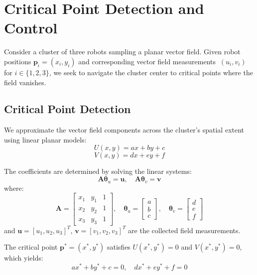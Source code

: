 \documentclass[lettersize,journal]{IEEEtran}
\begin{document}
\section{Critical Point Detection and Control}
\noindent 
Consider a cluster of three robots sampling a planar vector field. Given robot positions $\mathbf{p}_i = (x_i, y_i)$ and corresponding vector field measurements $\ (u_i, v_i)$ for $i \in \{1, 2, 3\}$, we seek to navigate the cluster center to critical points where the field vanishes.

\subsection{Critical Point Detection}
We approximate the vector field components across the cluster's spatial extent using linear planar models:
\begin{equation}
U(x,y) = ax + by + c
\end{equation}
\begin{equation}
V(x,y) = dx + ey + f
\end{equation}

The coefficients are determined by solving the linear systems:
\begin{equation}
\mathbf{A}\boldsymbol{\theta}_u = \mathbf{u}, \quad \mathbf{A}\boldsymbol{\theta}_v = \mathbf{v}
\end{equation}
where:
\begin{equation}
\mathbf{A} = \begin{bmatrix} x_1 & y_1 & 1 \\ x_2 & y_2 & 1 \\ x_3 & y_3 & 1 \end{bmatrix}, \quad \boldsymbol{\theta}_u = \begin{bmatrix} a \\ b \\ c \end{bmatrix}, \quad \boldsymbol{\theta}_v = \begin{bmatrix} d \\ e \\ f \end{bmatrix}
\end{equation}
and $\mathbf{u} = [u_1, u_2, u_3]^T$, $\mathbf{v} = [v_1, v_2, v_3]^T$ are the collected field measurements.

The critical point $\mathbf{p}^* = (x^*, y^*)$ satisfies $U(x^*, y^*) = 0$ and $V(x^*, y^*) = 0$, which yields:
\begin{equation}
ax^* + by^* + c = 0, \quad dx^* + ey^* + f = 0
\end{equation}
\end{document}
